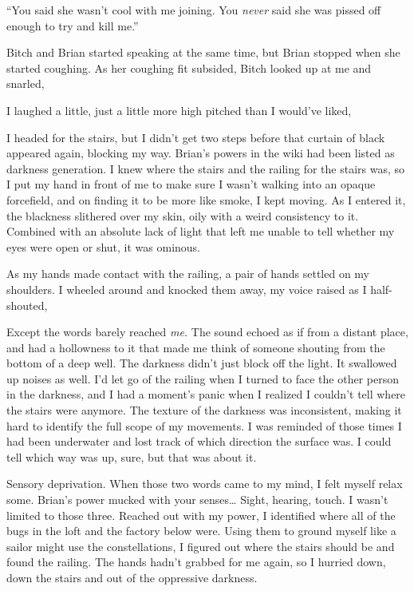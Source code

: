 
“You said she wasn't cool with me joining. You {\em never} said she was pissed off enough to try and kill me.”

Bitch and Brian started speaking at the same time, but Brian stopped when she started coughing. As her coughing fit subsided, Bitch looked up at me and snarled, 

I laughed a little, just a little more high pitched than I would've liked, 

I headed for the stairs, but I didn't get two steps before that curtain of black appeared again, blocking my way. Brian's powers in the wiki had been listed as darkness generation. I knew where the stairs and the railing for the stairs was, so I put my hand in front of me to make sure I wasn't walking into an opaque forcefield, and on finding it to be more like smoke, I kept moving. As I entered it, the blackness slithered over my skin, oily with a weird consistency to it. Combined with an absolute lack of light that left me unable to tell whether my eyes were open or shut, it was ominous.

As my hands made contact with the railing, a pair of hands settled on my shoulders. I wheeled around and knocked them away, my voice raised as I half-shouted, 

Except the words barely reached {\em me.} The sound echoed as if from a distant place, and had a hollowness to it that made me think of someone shouting from the bottom of a deep well. The darkness didn't just block off the light. It swallowed up noises as well. I'd let go of the railing when I turned to face the other person in the darkness, and I had a moment's panic when I realized I couldn't tell where the stairs were anymore. The texture of the darkness was inconsistent, making it hard to identify the full scope of my movements. I was reminded of those times I had been underwater and lost track of which direction the surface was. I could tell which way was up, sure, but that was about it.

Sensory deprivation. When those two words came to my mind, I felt myself relax some. Brian's power mucked with your senses\ldots{} Sight, hearing, touch. I wasn't limited to those three. Reached out with my power, I identified where all of the bugs in the loft and the factory below were. Using them to ground myself like a sailor might use the constellations, I figured out where the stairs should be and found the railing. The hands hadn't grabbed for me again, so I hurried down, down the stairs and out of the oppressive darkness.

